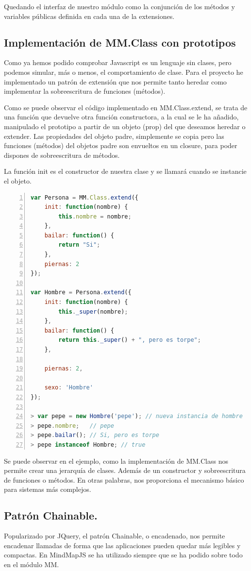 Quedando el interfaz de nuestro módulo como la conjunción de los métodos y variables públicas definida en cada una de la extensiones.


\subsection{Implementación de MM.Class con prototipos}
Como ya hemos podido comprobar Javascript es un lenguaje sin clases, pero podemos simular, más o menos, el comportamiento de clase. Para el proyecto he implementado un patrón de extensión que nos permite tanto heredar como implementar la sobreescritura de funciones (métodos). 




Como se puede observar el código implementado en MM.Class.extend, se trata de una función que devuelve otra función constructora, a la cual se le ha añadido, manipulado el prototipo a partir de un objeto (prop) del que deseamos heredar o extender. Las propiedades del objeto padre, simplemente se copia pero las funciones (métodos) del objetos padre son envueltos en un closure, para poder dispones de sobreescritura de métodos. 

La función init es el constructor de nuestra clase y se llamará cuando se instancie el objeto.

\begin{lstlisting}[language=JavaScript, numbers=left]
var Persona = MM.Class.extend({
	init: function(nombre) {
		this.nombre = nombre;
	},
	bailar: function() {
		return "Si";
	},
	piernas: 2
});

var Hombre = Persona.extend({
	init: function(nombre) {
		this._super(nombre);
	},
	bailar: function() {
		return this._super() + ", pero es torpe";
	},
	
	piernas: 2,
	
	sexo: 'Hombre'
});

> var pepe = new Hombre('pepe'); // nueva instancia de hombre
> pepe.nombre;   // pepe
> pepe.bailar(); // Si, pero es torpe
> pepe instanceof Hombre; // true
\end{lstlisting}

Se puede observar en el ejemplo, como la implementación de MM.Class nos permite crear una jerarquía de clases. Además de un constructor y sobreescritura de funciones o métodos. En otras palabras, nos proporciona el mecanismo básico para sistemas más complejos. 


\subsection{Patrón Chainable.}
Popularizado por JQuery, el patrón Chainable, o encadenado, nos permite encadenar llamadas de forma que las aplicaciones pueden quedar más legibles y compactas. En MindMapJS se ha utilizado siempre que se ha podido sobre todo en el módulo MM. 


